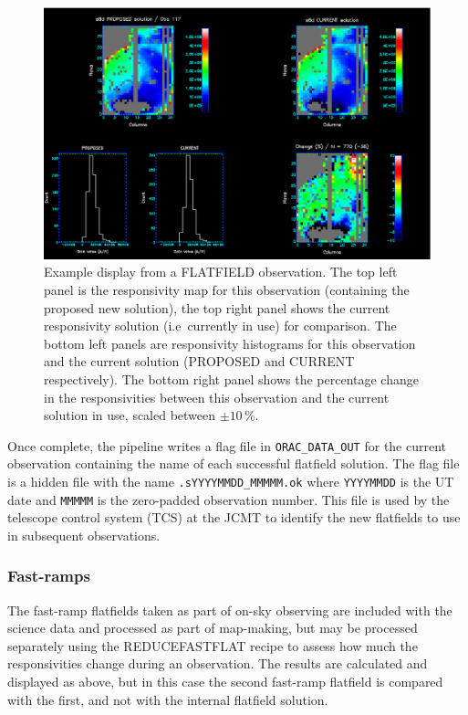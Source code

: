 \documentclass[twoside,11pt]{article}
\renewcommand{\_}{\texttt{\symbol{95}}}
\newcommand{\task}[1]{\textsf{#1}}
\begin{document}
\begin{figure}[t]
\centering
\includegraphics[width=\textwidth]{sun264_flatfield.eps}
\caption{Example display from a FLATFIELD observation. The top left
  panel is the responsivity map for this observation (containing the
  proposed new solution), the top right panel shows the current
  responsivity solution (i.e\ currently in use) for comparison. The
  bottom left panels are responsivity histograms for this observation
  and the current solution (PROPOSED and CURRENT respectively). The
  bottom right panel shows the percentage change in the responsivities
  between this observation and the current solution in use, scaled
  between $\pm10$\,\%.\label{fig:flatfield}}
\end{figure}

Once complete, the pipeline writes a flag file in
\verb+ORAC_DATA_OUT+ for the current observation containing the name
of each successful flatfield solution. The flag file is a hidden file
with the name \verb+.sYYYYMMDD_MMMMM.ok+ where \verb+YYYYMMDD+ is the
UT date and \verb+MMMMM+ is the zero-padded observation number. This
file is used by the telescope control system (TCS) at the JCMT to
identify the new flatfields to use in subsequent observations.

\subsubsection{Fast-ramps}

The fast-ramp flatfields taken as part of on-sky observing are
included with the science data and processed as part of map-making,
but may be processed separately using the \task{REDUCE\_FASTFLAT}
recipe to assess how much the responsivities change during an
observation. The results are calculated and displayed as above, but in
this case the second fast-ramp flatfield is compared with the first,
and not with the internal flatfield solution.
\end{document}
